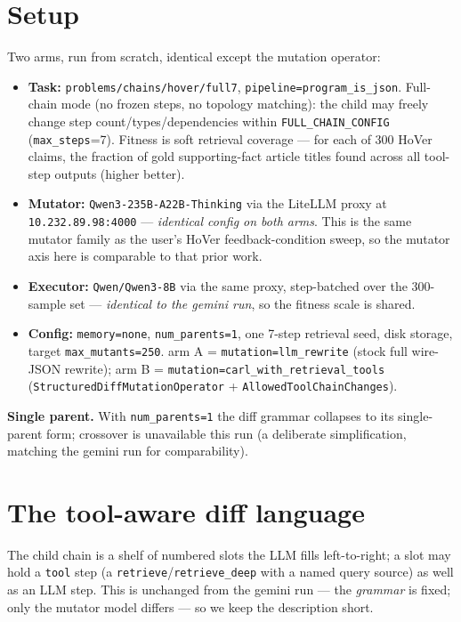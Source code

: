 \documentclass[11pt]{article}
\newcommand{\armA}{\textcolor{bad}{arm A}}
\newcommand{\armB}{\textcolor{accent}{arm B}}
\begin{document}
\section{Setup}
\label{sec:setup}
Two arms, run from scratch, identical except the mutation operator:
\begin{itemize}
  \item \textbf{Task:} \texttt{problems/chains/hover/full7}, \texttt{pipeline=program\_is\_json}.
  Full-chain mode (no frozen steps, no topology matching): the child may freely change step
  count/types/dependencies within \texttt{FULL\_CHAIN\_CONFIG} (\texttt{max\_steps}=7). Fitness
  is soft retrieval coverage --- for each of 300 HoVer claims, the fraction of gold
  supporting-fact article titles found across all tool-step outputs (higher better).
  \item \textbf{Mutator:} \texttt{Qwen3-235B-A22B-Thinking} via the LiteLLM proxy at
  \texttt{10.232.89.98:4000} --- \emph{identical config on both arms}. This is the same mutator
  family as the user's HoVer feedback-condition sweep, so the mutator axis here is comparable
  to that prior work.
  \item \textbf{Executor:} \texttt{Qwen/Qwen3-8B} via the same proxy, step-batched over the
  300-sample set --- \emph{identical to the gemini run}, so the fitness scale is shared.
  \item \textbf{Config:} \texttt{memory=none}, \texttt{num\_parents=1}, one 7-step retrieval
  seed, disk storage, target \texttt{max\_mutants=250}. \armA{} = \texttt{mutation=llm\_rewrite}
  (stock full wire-JSON rewrite); \armB{} = \texttt{mutation=carl\_with\_retrieval\_tools}
  (\texttt{StructuredDiffMutationOperator} + \texttt{AllowedToolChainChanges}).
\end{itemize}

\noindent\textbf{Single parent.} With \texttt{num\_parents=1} the diff grammar collapses to
its single-parent form; crossover is unavailable this run (a deliberate simplification, matching
the gemini run for comparability).

\section{The tool-aware diff language}
\label{sec:language}
The child chain is a shelf of numbered slots the LLM fills left-to-right; a slot may hold a
\texttt{tool} step (a \texttt{retrieve}/\texttt{retrieve\_deep} with a named query source) as well
as an LLM step. This is unchanged from the gemini run --- the \emph{grammar} is fixed; only the
mutator model differs --- so we keep the description short.
\end{document}
